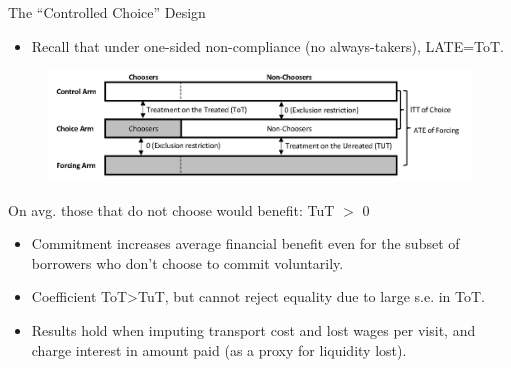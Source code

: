 \documentclass[8pt]{beamer}
\begin{document}
\begin{frame}{The ``Controlled Choice'' Design}
\label{cc_design}
\begin{itemize}
    \item Recall that under one-sided non-compliance (no always-takers), LATE=ToT.
\end{itemize}
\vspace{.2in}
\begin{figure}[H]
    \begin{center}
        \centering
        \includegraphics[width=1.0\textwidth]{Figuras/tot_tut_intuition.png}
    \end{center}
\end{figure}   
 \vfill
\end{frame}




\begin{frame}{On avg. those that do not choose would benefit: TuT $>$ 0}
\begin{itemize}
    \vfill \item Commitment increases average financial benefit even for the subset of borrowers who \alert{don't choose to commit voluntarily}.
    \vfill \item Coefficient ToT>TuT, but cannot reject equality due to large s.e. in ToT.
    \vfill \item Results hold when imputing transport cost and lost wages per visit, and charge interest in amount paid (as a proxy for liquidity lost).
\end{itemize}
\vspace{.2in}
\begin{table}[H]
\label{tot_tut}
\begin{center}
\small{}
\end{center}
\end{table}
\end{frame}

\end{document}
